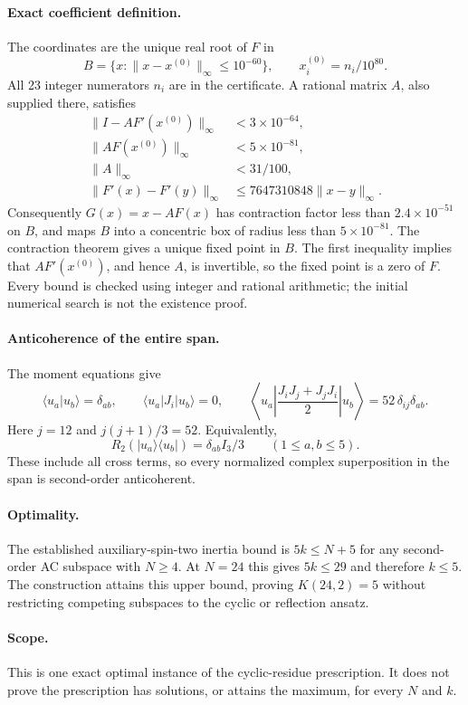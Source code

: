\documentclass{article}
\begin{document}
\paragraph{Exact coefficient definition.} The coordinates are the unique real root of $F$ in
\[
B=\{x:\|x-x^{(0)}\|_\infty\le10^{-60}\},\qquad
x_i^{(0)}=n_i/10^{80}.
\]
All 23 integer numerators $n_i$ are in the certificate. A rational matrix $A$, also supplied there, satisfies
\begin{align*}
\|I-AF'(x^{(0)})\|_\infty&<3\times10^{-64},\\
\|AF(x^{(0)})\|_\infty&<5\times10^{-81},\\
\|A\|_\infty&<31/100,\\
\|F'(x)-F'(y)\|_\infty&\le7647310848\|x-y\|_\infty.
\end{align*}
Consequently $G(x)=x-AF(x)$ has contraction factor less than $2.4\times10^{-51}$ on $B$, and maps $B$ into a concentric box of radius less than $5\times10^{-81}$. The contraction theorem gives a unique fixed point in $B$. The first inequality implies that $AF'(x^{(0)})$, and hence $A$, is invertible, so the fixed point is a zero of $F$. Every bound is checked using integer and rational arithmetic; the initial numerical search is not the existence proof.

\paragraph{Anticoherence of the entire span.} The moment equations give
\[
\langle u_a|u_b\rangle=\delta_{ab},\qquad
\langle u_a|J_i|u_b\rangle=0,\qquad
\left\langle u_a\left|\frac{J_iJ_j+J_jJ_i}{2}\right|u_b\right\rangle
=52\,\delta_{ij}\delta_{ab}.
\]
Here $j=12$ and $j(j+1)/3=52$. Equivalently,
\[
R_2(|u_a\rangle\langle u_b|)=\delta_{ab}I_3/3\qquad(1\le a,b\le5).
\]
These include all cross terms, so every normalized complex superposition in the span is second-order anticoherent.

\paragraph{Optimality.} The established auxiliary-spin-two inertia bound is $5k\le N+5$ for any second-order AC subspace with $N\ge4$. At $N=24$ this gives $5k\le29$ and therefore $k\le5$. The construction attains this upper bound, proving $K(24,2)=5$ without restricting competing subspaces to the cyclic or reflection ansatz.

\paragraph{Scope.} This is one exact optimal instance of the cyclic-residue prescription. It does not prove the prescription has solutions, or attains the maximum, for every $N$ and $k$.
\end{document}
